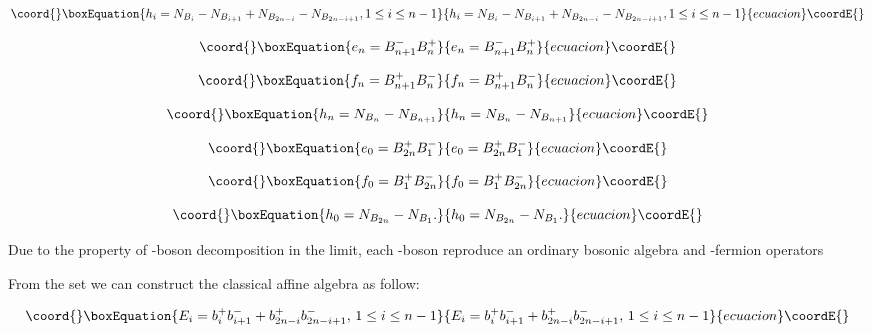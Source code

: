 \documentclass[a4paper,12pt,thmsa]{article}
\begin{document}
\begin{equation}\coord{}\boxEquation{
h_{i}=N_{B_{i}}-N_{B_{i+1}}+N_{B_{2n-i}}-N_{B_{2n-i+1}},1\leq i\leq n-1
}{
h_{i}=N_{B_{i}}-N_{B_{i+1}}+N_{B_{2n-i}}-N_{B_{2n-i+1}},1\leq i\leq n-1
}{ecuacion}\coordE{}\end{equation}

\begin{equation}\coord{}\boxEquation{
e_{n}=B_{n+1}^{-}B_{n}^{+}
}{
e_{n}=B_{n+1}^{-}B_{n}^{+}
}{ecuacion}\coordE{}\end{equation}

\begin{equation}\coord{}\boxEquation{
f_{n}=B_{n+1}^{+}B_{n}^{-}
}{
f_{n}=B_{n+1}^{+}B_{n}^{-}
}{ecuacion}\coordE{}\end{equation}

\begin{equation}\coord{}\boxEquation{
h_{n}=N_{B_{n}}-N_{B_{n+1}}
}{
h_{n}=N_{B_{n}}-N_{B_{n+1}}
}{ecuacion}\coordE{}\end{equation}

\begin{equation}\coord{}\boxEquation{
e_{0}=B_{2n}^{+}B_{1}^{-}
}{
e_{0}=B_{2n}^{+}B_{1}^{-}
}{ecuacion}\coordE{}\end{equation}

\begin{equation}\coord{}\boxEquation{
f_{0}=B_{1}^{+}B_{2n}^{-}
}{
f_{0}=B_{1}^{+}B_{2n}^{-}
}{ecuacion}\coordE{}\end{equation}

\begin{equation}\coord{}\boxEquation{
h_0=N_{B_{2n}}-N_{B_1}.
}{
h_0=N_{B_{2n}}-N_{B_1}.
}{ecuacion}\coordE{}\end{equation}

Due to the property of \coordHE{}-boson decomposition in the \coordHE{}
limit, each \coordHE{}-boson \coordHE{} reproduce an ordinary
bosonic algebra \coordHE{} and \coordHE{}-fermion operators \coordHE{}

From the set \coordHE{} we can construct the classical affine algebra \coordHE{} as follow:

\begin{equation}\coord{}\boxEquation{
E_i=b_i^{+}b_{i+1}^{-}+b_{2n-i}^{+}b_{2n-i+1}^{-},\, 1\leq i\leq
n-1
}{
E_i=b_i^{+}b_{i+1}^{-}+b_{2n-i}^{+}b_{2n-i+1}^{-},\, 1\leq i\leq
n-1
}{ecuacion}\coordE{}\end{equation}
\end{document}
